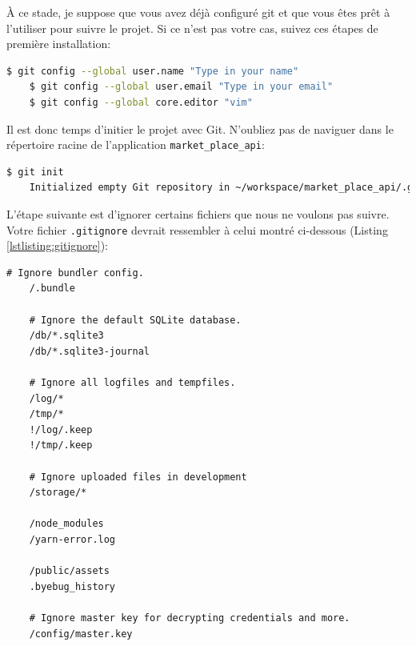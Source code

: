 \documentclass[]{report}
\begin{document}
    À ce stade, je suppose que vous avez déjà configuré git et que vous êtes prêt à l'utiliser pour suivre le projet. Si ce n'est pas votre cas, suivez ces étapes de première installation:

    \begin{scriptsize}
    \begin{lstlisting}[language=bash, breaklines]
    $ git config --global user.name "Type in your name"
    $ git config --global user.email "Type in your email"
    $ git config --global core.editor "vim"
    \end{lstlisting}
    \end{scriptsize}

    Il est donc temps d'initier le projet avec Git. N'oubliez pas de naviguer dans le répertoire racine de l'application \verb|market_place_api|:

    \begin{scriptsize}
    \begin{lstlisting}[language=bash, breaklines]
    $ git init
    Initialized empty Git repository in ~/workspace/market_place_api/.git/
    \end{lstlisting}
    \end{scriptsize}

    L'étape suivante est d'ignorer certains fichiers que nous ne voulons pas suivre. Votre fichier \verb|.gitignore| devrait ressembler à celui montré ci-dessous (Listing \ref{lstlisting:gitignore}):

    \begin{scriptsize}
    \begin{lstlisting}[breaklines, caption={La version modifiée du fichier .gitignore}, label={lstlisting:gitignore}]
    # Ignore bundler config.
    /.bundle

    # Ignore the default SQLite database.
    /db/*.sqlite3
    /db/*.sqlite3-journal

    # Ignore all logfiles and tempfiles.
    /log/*
    /tmp/*
    !/log/.keep
    !/tmp/.keep

    # Ignore uploaded files in development
    /storage/*

    /node_modules
    /yarn-error.log

    /public/assets
    .byebug_history

    # Ignore master key for decrypting credentials and more.
    /config/master.key
    \end{lstlisting}
    \end{scriptsize}
\end{document}
